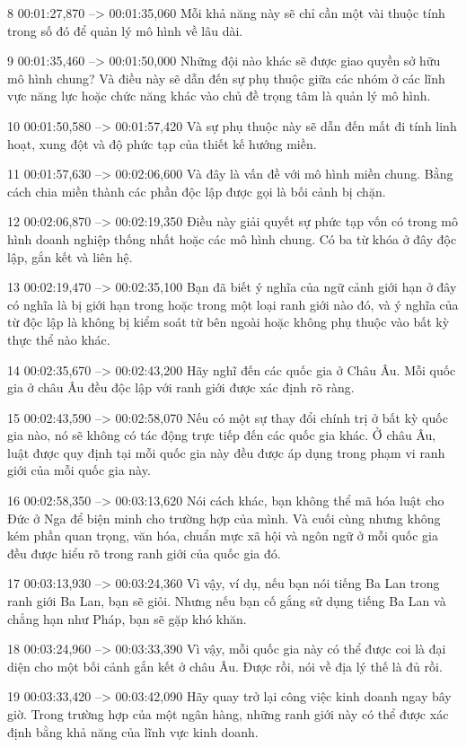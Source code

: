 8
00:01:27,870 --> 00:01:35,060
Mỗi khả năng này sẽ chỉ cần một vài thuộc tính trong số đó để quản lý mô hình về lâu dài.

9
00:01:35,460 --> 00:01:50,000
Những đội nào khác sẽ được giao quyền sở hữu mô hình chung?  Và điều này sẽ dẫn đến sự phụ thuộc giữa các nhóm ở các lĩnh vực năng lực hoặc chức năng khác vào chủ đề trọng tâm là quản lý mô hình.

10
00:01:50,580 --> 00:01:57,420
Và sự phụ thuộc này sẽ dẫn đến mất đi tính linh hoạt, xung đột và độ phức tạp của thiết kế hướng miền.

11
00:01:57,630 --> 00:02:06,600
Và đây là vấn đề với mô hình miền chung.  Bằng cách chia miền thành các phần độc lập được gọi là bối cảnh bị chặn.

12
00:02:06,870 --> 00:02:19,350
Điều này giải quyết sự phức tạp vốn có trong mô hình doanh nghiệp thống nhất hoặc các mô hình chung.  Có ba từ khóa ở đây độc lập, gắn kết và liên hệ.

13
00:02:19,470 --> 00:02:35,100
Bạn đã biết ý nghĩa của ngữ cảnh giới hạn ở đây có nghĩa là bị giới hạn trong hoặc trong một loại ranh giới nào đó, và ý nghĩa của từ độc lập là không bị kiểm soát từ bên ngoài hoặc không phụ thuộc vào bất kỳ thực thể nào khác.

14
00:02:35,670 --> 00:02:43,200
Hãy nghĩ đến các quốc gia ở Châu Âu.  Mỗi quốc gia ở châu Âu đều độc lập với ranh giới được xác định rõ ràng.

15
00:02:43,590 --> 00:02:58,070
Nếu có một sự thay đổi chính trị ở bất kỳ quốc gia nào, nó sẽ không có tác động trực tiếp đến các quốc gia khác.  Ở châu Âu, luật được quy định tại mỗi quốc gia này đều được áp dụng trong phạm vi ranh giới của mỗi quốc gia này.

16
00:02:58,350 --> 00:03:13,620
Nói cách khác, bạn không thể mã hóa luật cho Đức ở Nga để biện minh cho trường hợp của mình.  Và cuối cùng nhưng không kém phần quan trọng, văn hóa, chuẩn mực xã hội và ngôn ngữ ở mỗi quốc gia đều được hiểu rõ trong ranh giới của quốc gia đó.

17
00:03:13,930 --> 00:03:24,360
Vì vậy, ví dụ, nếu bạn nói tiếng Ba Lan trong ranh giới Ba Lan, bạn sẽ giỏi.  Nhưng nếu bạn cố gắng sử dụng tiếng Ba Lan và chẳng hạn như Pháp, bạn sẽ gặp khó khăn.

18
00:03:24,960 --> 00:03:33,390
Vì vậy, mỗi quốc gia này có thể được coi là đại diện cho một bối cảnh gắn kết ở châu Âu.  Được rồi, nói về địa lý thế là đủ rồi.

19
00:03:33,420 --> 00:03:42,090
Hãy quay trở lại công việc kinh doanh ngay bây giờ.  Trong trường hợp của một ngân hàng, những ranh giới này có thể được xác định bằng khả năng của lĩnh vực kinh doanh.


